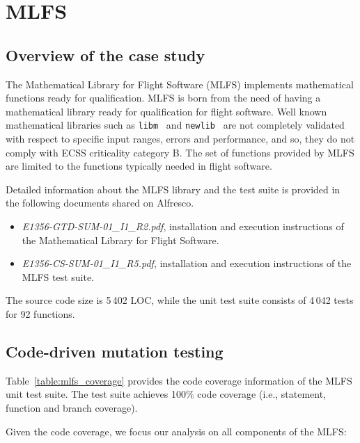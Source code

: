 \clearpage

\section{MLFS}
\label{sec:caseStudies:GSL:MLSF}

\subsection{Overview of the case study}

The Mathematical Library for Flight Software (MLFS) implements mathematical functions ready for qualification. 
MLFS is born from the need of having a mathematical library ready for qualification for flight software. Well known mathematical libraries such as \texttt{libm}~\cite{libm} and \texttt{newlib}~\cite{newlib} are not completely validated with respect to specific input ranges, errors and performance, and so, they do not comply with ECSS criticality category B.
The set of functions provided by MLFS are limited to the functions typically needed in flight software. 

Detailed information about the MLFS library and the test suite is provided in the following documents shared on Alfresco.

\begin{itemize}
	\item \emph{E1356-GTD-SUM-01\_I1\_R2.pdf}, installation and execution instructions of the Mathematical Library for Flight Software. 
	\item \emph{E1356-CS-SUM-01\_I1\_R5.pdf}, installation and execution instructions of the MLFS test suite.
\end{itemize}

The source code size is 5\,402 LOC, while the unit test suite consists of 4\,042 tests for 92 functions.

\subsection{Code-driven mutation testing}



Table~\ref{table:mlfs_coverage} provides the code coverage information of the MLFS unit test suite. The test suite achieves 100\% code coverage (i.e., statement, function and branch coverage).

Given the code coverage, we focus our analysis on all components of the MLFS:

